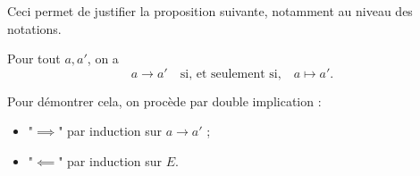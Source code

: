 \documentclass[../main]{subfiles}
\begin{document}
  Ceci permet de justifier la proposition suivante, notamment au niveau des notations.

  \begin{prop}
    Pour tout $a, a'$, on a \[
    a \to a' \quad \text{si, et seulement si,} \quad a \mapsto a'
    .\]
  \end{prop}
  
  \begin{prv}
    Pour démontrer cela, on procède par double implication :
    \begin{itemize}
      \item "$\implies$" par induction sur $a \to a'$ ;
      \item "$\impliedby$" par induction sur $E$.
    \end{itemize}
  \end{prv}
\end{document}
